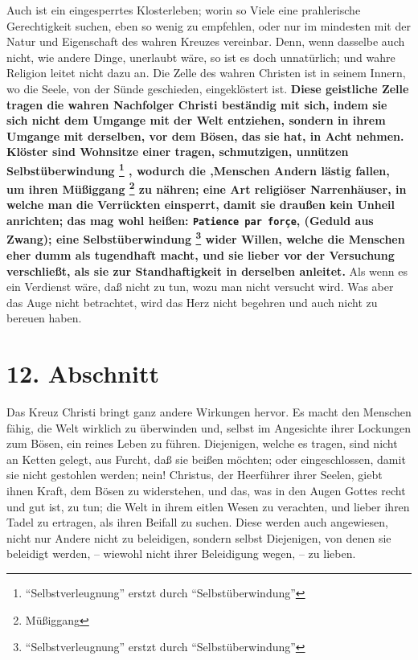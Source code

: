 Auch ist ein eingesperrtes Klosterleben; worin so Viele eine
prahlerische
Gerechtigkeit suchen, eben so wenig zu empfehlen, oder nur im mindesten mit der
Natur und Eigenschaft des wahren Kreuzes vereinbar. Denn, wenn dasselbe auch
nicht, wie andere Dinge, unerlaubt wäre, so ist es doch unnatürlich; und wahre
Religion leitet nicht dazu an. Die Zelle des wahren Christen ist in seinem
Innern, wo die Seele, von der Sünde geschieden, eingeklöstert ist. \textbf{Diese
geistliche Zelle tragen die wahren Nachfolger Christi beständig mit sich, indem
sie sich nicht dem Umgange mit der Welt entziehen, sondern in ihrem Umgange mit
derselben, vor dem Bösen, das sie hat, in Acht nehmen. Klöster sind Wohnsitze
einer tragen, schmutzigen, unnützen Selbstüberwindung \footnote{"`Selbstverleugnung"' erstzt durch "`Selbstüberwindung"'}
, wodurch die ,Menschen
Andern lästig fallen, um ihren Müßiggang \footnote{Müßiggang} zu nähren; eine
Art religiöser Narrenhäuser, in welche man die Verrückten einsperrt, damit sie draußen kein
Unheil anrichten; das mag wohl heißen: \texttt{Patience par forçe}, (Geduld aus
Zwang); eine Selbstüberwindung \footnote{"`Selbstverleugnung"' erstzt durch "`Selbstüberwindung"'} wider  Willen, welche die Menschen eher dumm als
tugendhaft macht, und sie lieber vor der Versuchung verschließt, als sie zur
Standhaftigkeit in derselben anleitet.} Als wenn es ein Verdienst wäre, daß nicht
zu tun, wozu man nicht versucht wird. Was aber das Auge nicht betrachtet, wird
das Herz nicht begehren und auch nicht zu bereuen haben.

\section{12. Abschnitt} \label{kap5_ab12}

Das Kreuz Christi bringt ganz andere Wirkungen hervor. Es macht den Menschen
fähig, die Welt wirklich zu überwinden und, selbst im Angesichte ihrer Lockungen
zum Bösen, ein reines Leben zu führen. Diejenigen, welche es tragen, sind nicht
an Ketten gelegt, aus Furcht, daß sie beißen möchten; oder eingeschlossen, damit
sie nicht gestohlen werden; nein! Christus, der Heerführer ihrer Seelen, giebt
ihnen Kraft, dem Bösen zu widerstehen, und das, was in den Augen Gottes recht
und gut ist, zu tun; die Welt in ihrem eitlen Wesen zu verachten, und lieber
ihren Tadel zu ertragen, als ihren Beifall zu suchen.  Diese werden auch
angewiesen, nicht nur Andere nicht zu beleidigen, sondern selbst Diejenigen, von
denen sie beleidigt werden, -- wiewohl nicht ihrer Beleidigung wegen, -- zu
lieben.

